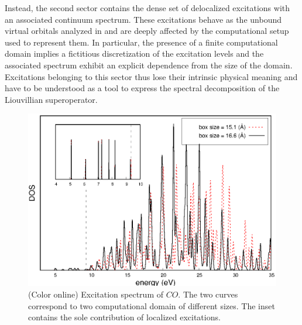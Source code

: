 \documentclass[reprint,aps,prb]{revtex4-1}
\begin{document}
Instead, the second sector contains the dense set of delocalized excitations with an associated continuum spectrum. These excitations behave as the unbound virtual orbitals analyzed in \cite{boffi2016} 
and are deeply affected by the computational setup used to represent them. In particular, the presence of a finite computational domain implies a fictitious discretization of the excitation levels and 
the associated spectrum exhibit an explicit dependence from the size of the domain. Excitations belonging to this sector thus lose their intrinsic physical meaning and have to be understood as a tool to 
express the spectral decomposition of the Liouvillian superoperator. 

\begin{figure}[ht]
\includegraphics[scale=0.6]{CO_dos.eps}
\caption{(Color online) Excitation spectrum of $CO$. The two curves correspond to two computational domain of different sizes. The inset contains the sole contribution of localized excitations.}
\label{CO_exc}
\end{figure}

% 
\end{document}
